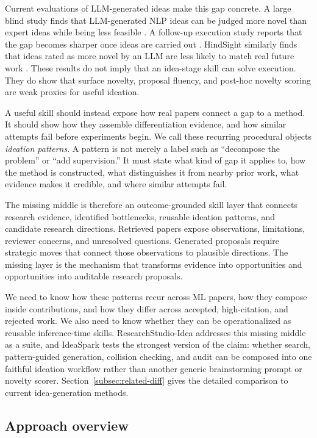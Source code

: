\documentclass[10pt,a4paper]{article}
\begin{document}
Current evaluations of LLM-generated ideas make this gap concrete. A large blind study finds that LLM-generated NLP ideas can be judged more novel than expert ideas while being less feasible \cite{si2024llmideas}. A follow-up execution study reports that the gap becomes sharper once ideas are carried out \cite{si2026execution}. HindSight similarly finds that ideas rated as more novel by an LLM are less likely to match real future work \cite{hindsight2026}. These results do not imply that an idea-stage skill can solve execution. They do show that surface novelty, proposal fluency, and post-hoc novelty scoring are weak proxies for useful ideation.

A useful skill should instead expose how real papers connect a gap to a method. It should show how they assemble differentiation evidence, and how similar attempts fail before experiments begin. We call these recurring procedural objects \emph{ideation patterns}. A pattern is not merely a label such as ``decompose the problem'' or ``add supervision.'' It must state what kind of gap it applies to, how the method is constructed, what distinguishes it from nearby prior work, what evidence makes it credible, and where similar attempts fail.

The missing middle is therefore an outcome-grounded skill layer that connects research evidence, identified bottlenecks, reusable ideation patterns, and candidate research directions. Retrieved papers expose observations, limitations, reviewer concerns, and unresolved questions. Generated proposals require strategic moves that connect those observations to plausible directions. The missing layer is the mechanism that transforms evidence into opportunities and opportunities into auditable research proposals.

We need to know how these patterns recur across ML papers, how they compose inside contributions, and how they differ across accepted, high-citation, and rejected work. We also need to know whether they can be operationalized as reusable inference-time skills. ResearchStudio-Idea addresses this missing middle as a suite, and IdeaSpark tests the strongest version of the claim: whether search, pattern-guided generation, collision checking, and audit can be composed into one faithful ideation workflow rather than another generic brainstorming prompt or novelty scorer. Section~\ref{subsec:related-diff} gives the detailed comparison to current idea-generation methods.

\subsection{Approach overview}
\end{document}
